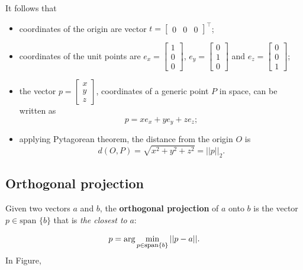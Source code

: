 \documentclass[10pt]{report}
\begin{document}
It follows that
\begin{itemize}
\item coordinates of the origin are vector \(t = \begin{bmatrix} 0 & 0 & 0 \end{bmatrix}^\top\);
\item coordinates of the unit points are \(e_x = \begin{bmatrix} 1 \\ 0 \\ 0\end{bmatrix}\), \(e_y = \begin{bmatrix} 0 \\ 1 \\ 0\end{bmatrix}\) and \(e_z = \begin{bmatrix} 0 \\ 0 \\ 1\end{bmatrix}\);
\item the vector \(p = \begin{bmatrix}x \\ y \\ z\end{bmatrix}\), coordinates of a generic point \(P\) in space, can be written as $$p = xe_x + ye_y + ze_z;$$
\item applying Pytagorean theorem, the distance from the origin \(O\) is $$d(O, P) = \sqrt{x^2 + y^2 + z^2} = ||p||_2.$$
\end{itemize}
\subsection{Orthogonal projection}
\label{sec:orge3f5834}
Given two vectors \(a\) and \(b\), the \textbf{orthogonal projection} of \(a\) onto \(b\) is the vector \(p \in \mbox{span }\{b\}\) that is \emph{the closest to} \(a\):

$$p = \mbox{arg}\min_{p\in\mbox{\footnotesize span}\{b\}} ||p - a||.$$ In Figure,
\end{document}
